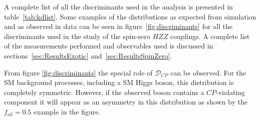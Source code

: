 A complete list of all the discriminants used in the analysis is presented in table~\ref{tab:kdlist}.
Some examples of the distributions as expected from simulation and as observed in data can be seen
in figure~\ref{fig:discriminants} for all the discriminants used in the study of the spin-zero $HZZ$ couplings.
A complete list of the measurements performed and observables used is discussed in sections~\ref{sec:ResultsExotic}
and~\ref{sec:ResultsSpinZero}. 

From figure \ref{fig:discriminants} the special role of $\mathcal{D}_{C\!P}$ can be observed. For the SM background processes, including a SM Higgs boson, this distribution is completely symmetric. However, if the observed boson contains a $C\!P$-violating component it will appear as an asymmetry in this distribution as shown by the $f_{a3} = 0.5$ example in the figure. 

